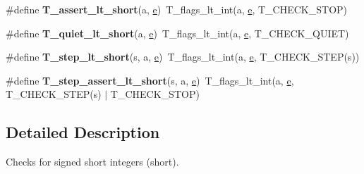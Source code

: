 \begin{DoxyCompactItemize}
\item 
\mbox{\label{group__RTEMSTestFrameworkChecksShort_ga0541b8c6588de5b59fe1ba541d8a48ca}} 
\#define {\bfseries T\+\_\+assert\+\_\+lt\+\_\+short}(a,  \mbox{\hyperlink{sun4u_2tte_8h_a8b0b9ed08e0e18920ec2682f48228c27}{e}})~T\+\_\+flags\+\_\+lt\+\_\+int(a, \mbox{\hyperlink{sun4u_2tte_8h_a8b0b9ed08e0e18920ec2682f48228c27}{e}}, T\+\_\+\+C\+H\+E\+C\+K\+\_\+\+S\+T\+OP)
\item 
\mbox{\label{group__RTEMSTestFrameworkChecksShort_gac51f6d1c0fe553133ef05c1e453f0c94}} 
\#define {\bfseries T\+\_\+quiet\+\_\+lt\+\_\+short}(a,  \mbox{\hyperlink{sun4u_2tte_8h_a8b0b9ed08e0e18920ec2682f48228c27}{e}})~T\+\_\+flags\+\_\+lt\+\_\+int(a, \mbox{\hyperlink{sun4u_2tte_8h_a8b0b9ed08e0e18920ec2682f48228c27}{e}}, T\+\_\+\+C\+H\+E\+C\+K\+\_\+\+Q\+U\+I\+ET)
\item 
\mbox{\label{group__RTEMSTestFrameworkChecksShort_gad1fa9e94a2ccc6fec2948cfad74f460c}} 
\#define {\bfseries T\+\_\+step\+\_\+lt\+\_\+short}(s,  a,  \mbox{\hyperlink{sun4u_2tte_8h_a8b0b9ed08e0e18920ec2682f48228c27}{e}})~T\+\_\+flags\+\_\+lt\+\_\+int(a, \mbox{\hyperlink{sun4u_2tte_8h_a8b0b9ed08e0e18920ec2682f48228c27}{e}}, T\+\_\+\+C\+H\+E\+C\+K\+\_\+\+S\+T\+EP(s))
\item 
\mbox{\label{group__RTEMSTestFrameworkChecksShort_gacf7079f614499143b8b61d15332520a3}} 
\#define {\bfseries T\+\_\+step\+\_\+assert\+\_\+lt\+\_\+short}(s,  a,  \mbox{\hyperlink{sun4u_2tte_8h_a8b0b9ed08e0e18920ec2682f48228c27}{e}})~T\+\_\+flags\+\_\+lt\+\_\+int(a, \mbox{\hyperlink{sun4u_2tte_8h_a8b0b9ed08e0e18920ec2682f48228c27}{e}}, T\+\_\+\+C\+H\+E\+C\+K\+\_\+\+S\+T\+EP(s) $\vert$ T\+\_\+\+C\+H\+E\+C\+K\+\_\+\+S\+T\+OP)
\end{DoxyCompactItemize}


\subsection{Detailed Description}
Checks for signed short integers (short). 

